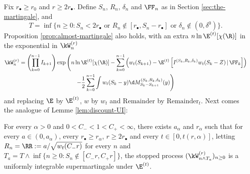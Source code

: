\documentclass[10pt,a4paper]{article}
\begin{document}
Fix $r_\bullet \geq r_0$ and $r\geq 2r_\bullet$. 
Define $S_n$, $R_n$, $\delta_n$ and $\FF_n$ as in Section \ref{sec:the-martingale}, and 
\[ T = \inf\{n\geq 0: S_n < 2r_\bullet \text{ or } R_n\notin [r_\bullet, S_n-r_\bullet] \text{ or } \delta_n \notin (0,\delta^0)\}. \]
Proposition \ref{prop:almost-martingale} also holds, with an extra $n\ln\E^{(t)}[\chi(\R)]$ in the exponential in $\kW^{(r)}_n$
\begin{multline}\label{eq:2def-Z-vol}
\kW^{(r)}_n = \left(\prod_{k=0}^{n-1} I_{k+1}\right) \exp\Bigg( n \ln\E^{(t)}[\chi(\R)] - \sum_{k=0}^{n-1} \left(w_t(S_{k+1}) - \E^{(t)}\left[I^{(S_{k}, R_{k}, \delta_{k})} w_t(S_{k}-Z) \, | \, \FF_{k} \right] \right) \\
-\frac{1}{2} \sum_{k=0}^{n-1} \int w_t(S_{k}-y) \d M_{S_k-S_{k+1}}^{(S_k, R_k, \delta_k)}(y) \Bigg) 
\end{multline}
and replacing $\E$ by $\E^{(t)}$, $w$ by $w_t$ and $\mathrm{Remainder}$ by $\mathrm{Remainder}_t$. 
Next comes the analogue of Lemme \ref{lem:discount-UI}: 




\begin{lemma}\label{lem:2discount-UI-vol}
For every $\alpha>0$ and $0<C_-<1<C_+<\infty$, there exists $a_\alpha$ and $r_\alpha$ such that for every $a\in (0,a_\alpha)$, every $r_\bullet \geq r_\alpha$, $r\geq 2 r_\bullet$ and every $t\in [0,t(r,\alpha)]$, letting $R_n = \RR := a / \sqrt{w_t(C_- r)}$ for every $n$ and $T_a = T \wedge \inf \{ n\geq 0 : S_n \notin [C_-r, C_+r] \}$, 
the stopped process $(\kW^{(r)}_{n\wedge T_a})_{n\geq 0}$ is a uniformly integrable supermartingale under $\E^{(t)}$. 
\end{lemma}


\end{document}
